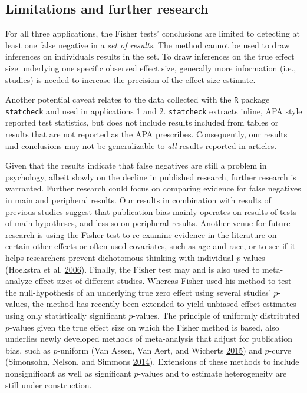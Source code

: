 \documentclass[a5paper]{book}
\begin{document}
\subsection{Limitations and further
research}\label{limitations-and-further-research}

For all three applications, the Fisher tests' conclusions are limited to
detecting at least one false negative in a \emph{set of results}. The
method cannot be used to draw inferences on individuals results in the
set. To draw inferences on the true effect size underlying one specific
observed effect size, generally more information (i.e., studies) is
needed to increase the precision of the effect size estimate.

Another potential caveat relates to the data collected with the
\texttt{R} package \texttt{statcheck} and used in applications 1 and 2.
\texttt{statcheck} extracts inline, APA style reported test statistics,
but does not include results included from tables or results that are
not reported as the APA prescribes. Consequently, our results and
conclusions may not be generalizable to \emph{all} results reported in
articles.

Given that the results indicate that false negatives are still a problem
in psychology, albeit slowly on the decline in published research,
further research is warranted. Further research could focus on comparing
evidence for false negatives in main and peripheral results. Our results
in combination with results of previous studies suggest that publication
bias mainly operates on results of tests of main hypotheses, and less so
on peripheral results. Another venue for future research is using the
Fisher test to re-examine evidence in the literature on certain other
effects or often-used covariates, such as age and race, or to see if it
helps researchers prevent dichotomous thinking with individual
\(p\)-values (Hoekstra et al.
\protect\hyperlink{ref-doi:10.3758ux2fbf03213921}{2006}). Finally, the
Fisher test may and is also used to meta-analyze effect sizes of
different studies. Whereas Fisher used his method to test the
null-hypothesis of an underlying true zero effect using several studies'
\(p\)-values, the method has recently been extended to yield unbiased
effect estimates using only statistically significant \(p\)-values. The
principle of uniformly distributed \(p\)-values given the true effect
size on which the Fisher method is based, also underlies newly developed
methods of meta-analysis that adjust for publication bias, such as
\(p\)-uniform (Van Assen, Van Aert, and Wicherts
\protect\hyperlink{ref-doi:10.1037ux2fmet0000025}{2015}) and \(p\)-curve
(Simonsohn, Nelson, and Simmons
\protect\hyperlink{ref-doi:10.1037ux2fa0033242}{2014}). Extensions of
these methods to include nonsignificant as well as significant
\(p\)-values and to estimate heterogeneity are still under construction.
\end{document}
